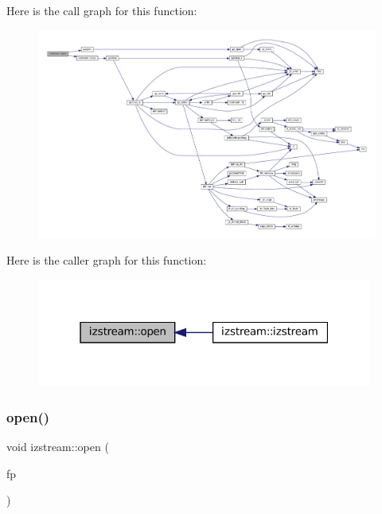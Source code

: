 Here is the call graph for this function\+:
\nopagebreak
\begin{figure}[H]
\begin{center}
\leavevmode
\includegraphics[width=350pt]{classizstream_a3e0af69bbc4704daa637850817b77098_cgraph}
\end{center}
\end{figure}
Here is the caller graph for this function\+:
\nopagebreak
\begin{figure}[H]
\begin{center}
\leavevmode
\includegraphics[width=313pt]{classizstream_a3e0af69bbc4704daa637850817b77098_icgraph}
\end{center}
\end{figure}
\mbox{\label{classizstream_a1ddcaff781f58a08576f0935be5ccd3c}} 
\subsubsection{\texorpdfstring{open()}{open()}\hspace{0.1cm}{\footnotesize\ttfamily [2/2]}}
{\footnotesize\ttfamily void izstream\+::open (\begin{DoxyParamCaption}\item[{F\+I\+LE $\ast$}]{fp }\end{DoxyParamCaption})\hspace{0.3cm}{\ttfamily [inline]}}

